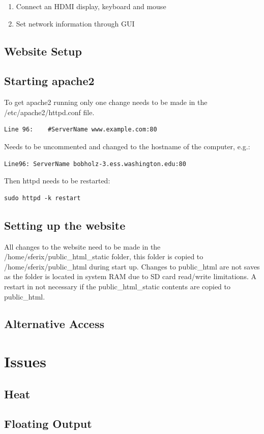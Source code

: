 \begin{enumerate}
\item{Connect an HDMI display, keyboard and mouse}
\item{Set network information through GUI}
\end{enumerate}

\begin{centering}
\section*{Website Setup}
\end{centering}

\subsection*{Starting apache2}

To get apache2 running only one change needs to be made in the /etc/apache2/httpd.conf file.

\begin{verbatim}
Line 96:	#ServerName www.example.com:80
\end{verbatim}

Needs to be uncommented and changed to the hostname of the computer, e.g.:

\begin{verbatim}
Line96:	ServerName bobholz-3.ess.washington.edu:80
\end{verbatim}

Then httpd needs to be restarted:

\begin{verbatim}
sudo httpd -k restart
\end{verbatim}

\subsection*{Setting up the website}

All changes to the website need to be made in the /home/sferix/public\_html\_static folder, this folder is copied to /home/sferix/public\_html during start up.
Changes to public\_html are not saves as the folder is located in system RAM due to SD card read/write limitations.
A restart in not necessary if the public\_html\_static contents are copied to public\_html.



\subsection{Alternative Access}

\section{Issues}

\subsection{Heat}

\subsection{Floating Output}